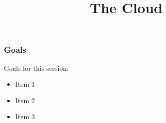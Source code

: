 

\title[OpenStack \& Rackspace]{The Cloud}



\begin{frame}
\frametitle{Goals}

Goals for this session:
\begin{itemize}
\item Item 1
\item Item 2
\item Item 3
\end{itemize}

\end{frame}



